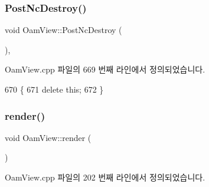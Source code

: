 \subsubsection{\texorpdfstring{Post\+Nc\+Destroy()}{PostNcDestroy()}}
{\footnotesize\ttfamily void Oam\+View\+::\+Post\+Nc\+Destroy (\begin{DoxyParamCaption}{ }\end{DoxyParamCaption})\hspace{0.3cm}{\ttfamily [protected]}, {\ttfamily [virtual]}}



Oam\+View.\+cpp 파일의 669 번째 라인에서 정의되었습니다.


\begin{DoxyCode}
670 \{
671   \textcolor{keyword}{delete} \textcolor{keyword}{this};
672 \}
\end{DoxyCode}
\mbox{\label{class_oam_view_a391d8ee2931b2927e936c7100e676451}} 
\subsubsection{\texorpdfstring{render()}{render()}}
{\footnotesize\ttfamily void Oam\+View\+::render (\begin{DoxyParamCaption}{ }\end{DoxyParamCaption})}



Oam\+View.\+cpp 파일의 202 번째 라인에서 정의되었습니다.


